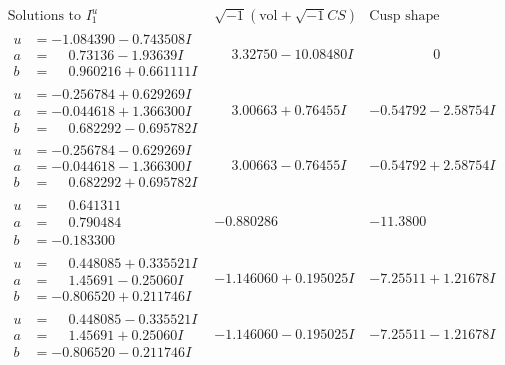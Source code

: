 \documentclass[1p]{elsarticle_modified}
\theoremstyle{definition}
\newcommand{\I}{\sqrt{-1}}
\begin{document}
$$\begin{array}{c|c|c}
\text{Solutions to }I^u_{1}& \I (\text{vol} + \sqrt{-1}CS) & \text{Cusp shape}\\
 \hline 
\begin{aligned}
u &= -1.084390 - 0.743508 I \\
a &= \phantom{-}0.73136 - 1.93639 I \\
b &= \phantom{-}0.960216 + 0.661111 I\end{aligned}
 & \phantom{-}3.32750 - 10.08480 I & \phantom{-0.000000 } 0 \\ \hline\begin{aligned}
u &= -0.256784 + 0.629269 I \\
a &= -0.044618 + 1.366300 I \\
b &= \phantom{-}0.682292 - 0.695782 I\end{aligned}
 & \phantom{-}3.00663 + 0.76455 I & -0.54792 - 2.58754 I \\ \hline\begin{aligned}
u &= -0.256784 - 0.629269 I \\
a &= -0.044618 - 1.366300 I \\
b &= \phantom{-}0.682292 + 0.695782 I\end{aligned}
 & \phantom{-}3.00663 - 0.76455 I & -0.54792 + 2.58754 I \\ \hline\begin{aligned}
u &= \phantom{-}0.641311\phantom{ +0.000000I} \\
a &= \phantom{-}0.790484\phantom{ +0.000000I} \\
b &= -0.183300\phantom{ +0.000000I}\end{aligned}
 & -0.880286\phantom{ +0.000000I} & -11.3800\phantom{ +0.000000I} \\ \hline\begin{aligned}
u &= \phantom{-}0.448085 + 0.335521 I \\
a &= \phantom{-}1.45691 - 0.25060 I \\
b &= -0.806520 + 0.211746 I\end{aligned}
 & -1.146060 + 0.195025 I & -7.25511 + 1.21678 I \\ \hline\begin{aligned}
u &= \phantom{-}0.448085 - 0.335521 I \\
a &= \phantom{-}1.45691 + 0.25060 I \\
b &= -0.806520 - 0.211746 I\end{aligned}
 & -1.146060 - 0.195025 I & -7.25511 - 1.21678 I \\ \hline\begin{aligned}

\end{aligned}
\end{array}$$
\end{document}
